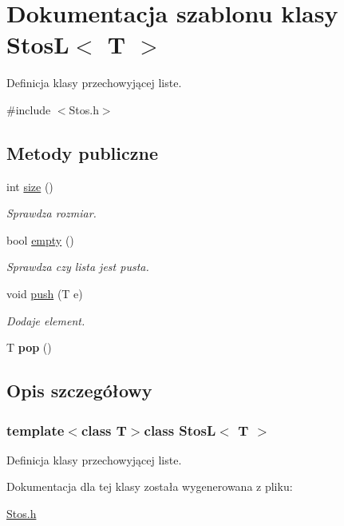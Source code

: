 \hypertarget{class_stos_l}{\section{\-Dokumentacja szablonu klasy \-Stos\-L$<$ \-T $>$}
\label{class_stos_l}
}


\-Definicja klasy przechowyjącej liste.  




{\ttfamily \#include $<$\-Stos.\-h$>$}

\subsection*{\-Metody publiczne}
\begin{DoxyCompactItemize}
\item 
\hypertarget{class_stos_l_aa33a51cb0ca3dbf005df8765586ce964}{int \hyperlink{class_stos_l_aa33a51cb0ca3dbf005df8765586ce964}{size} ()}\label{class_stos_l_aa33a51cb0ca3dbf005df8765586ce964}

\begin{DoxyCompactList}\small\item\em \-Sprawdza rozmiar. \end{DoxyCompactList}\item 
\hypertarget{class_stos_l_a6ea23455139de8753792dc8682890055}{bool \hyperlink{class_stos_l_a6ea23455139de8753792dc8682890055}{empty} ()}\label{class_stos_l_a6ea23455139de8753792dc8682890055}

\begin{DoxyCompactList}\small\item\em \-Sprawdza czy lista jest pusta. \end{DoxyCompactList}\item 
\hypertarget{class_stos_l_af72c5941f1f181fc6b76570d978986d9}{void \hyperlink{class_stos_l_af72c5941f1f181fc6b76570d978986d9}{push} (\-T e)}\label{class_stos_l_af72c5941f1f181fc6b76570d978986d9}

\begin{DoxyCompactList}\small\item\em \-Dodaje element. \end{DoxyCompactList}\item 
\hypertarget{class_stos_l_a0430ba75c3c71ed85362cbbe8e8dc2bd}{\-T {\bfseries pop} ()}\label{class_stos_l_a0430ba75c3c71ed85362cbbe8e8dc2bd}

\end{DoxyCompactItemize}


\subsection{\-Opis szczegółowy}
\subsubsection*{template$<$class T$>$class Stos\-L$<$ T $>$}

\-Definicja klasy przechowyjącej liste. 

\-Dokumentacja dla tej klasy została wygenerowana z pliku\-:\begin{DoxyCompactItemize}
\item 
\hyperlink{_stos_8h}{\-Stos.\-h}\end{DoxyCompactItemize}

